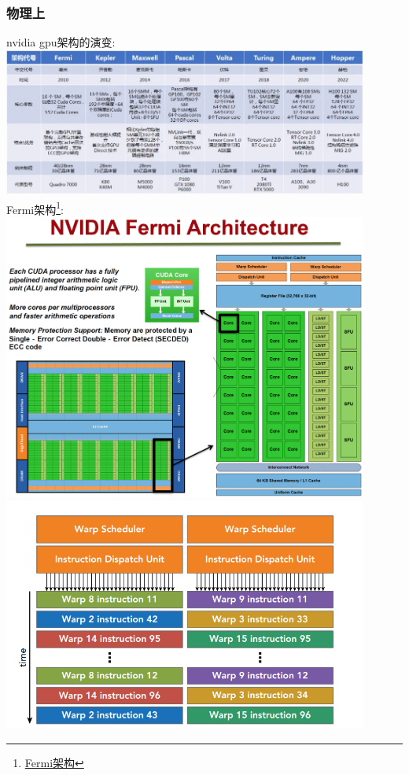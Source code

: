 \subsubsection{物理上}
\noindent
nvidia gpu架构的演变:\\
\includegraphics[width=0.9\textwidth]{assets/gpu.jpg}\\
Fermi架构\footnote{\href{https://www.nvidia.com/content/PDF/fermi_white_papers/NVIDIA_Fermi_Compute_Architecture_Whitepaper.pdf}{Fermi架构}}:\\
\includegraphics[width=0.9\textwidth]{assets/fermi.png}\\
\includegraphics[width=0.9\textwidth]{assets/warp.png}\\

